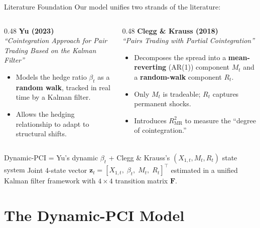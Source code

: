 \documentclass[10pt, aspectratio=169]{beamer}
\begin{document}
\begin{frame}{Literature Foundation}
  Our model unifies two strands of the literature:
  \vspace{6pt}
  \begin{columns}[T]
    \begin{column}{0.48\textwidth}
      \textbf{Yu (2023)}\\[3pt]
      \emph{``Cointegration Approach for Pair Trading Based on the
      Kalman Filter''}
      \begin{itemize}
        \item Models the hedge ratio $\beta_t$ as a \textbf{random walk},
              tracked in real time by a Kalman filter.
        \item Allows the hedging relationship to adapt to structural shifts.
      \end{itemize}
    \end{column}
    \begin{column}{0.48\textwidth}
      \textbf{Clegg \& Krauss (2018)}\\[3pt]
      \emph{``Pairs Trading with Partial Cointegration''}
      \begin{itemize}
        \item Decomposes the spread into a \textbf{mean-reverting} (AR(1))
              component $M_t$ and a \textbf{random-walk} component $R_t$.
        \item Only $M_t$ is tradeable; $R_t$ captures permanent shocks.
        \item Introduces $R^2_{\text{MR}}$ to measure the
              ``degree of cointegration.''
      \end{itemize}
    \end{column}
  \end{columns}
  \vspace{8pt}
  \begin{block}{Dynamic-PCI = Yu's dynamic $\beta_t$ + Clegg \& Krauss's $(X_{1,t}, M_t, R_t)$ state system}
    Joint 4-state vector $\bm{z}_t = [X_{1,t},\; \beta_t,\; M_t,\; R_t]^\top$ estimated
    in a unified Kalman filter framework with $4 \times 4$ transition matrix $\bm{F}$.
  \end{block}
\end{frame}

\section{The Dynamic-PCI Model}
\end{document}
